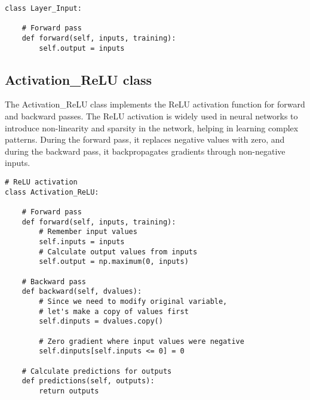 \documentclass{article}
\begin{document}
\begin{lstlisting}
class Layer_Input:

    # Forward pass
    def forward(self, inputs, training):
        self.output = inputs
\end{lstlisting}
\pagebreak

\subsection{Activation\_ReLU class}

The Activation\_ReLU class implements the ReLU activation function for forward and backward passes. The ReLU activation is widely used in neural networks to introduce non-linearity and sparsity in the network, helping in learning complex patterns. During the forward pass, it replaces negative values with zero, and during the backward pass, it backpropagates gradients through non-negative inputs.
\begin{lstlisting}
# ReLU activation
class Activation_ReLU:

    # Forward pass
    def forward(self, inputs, training):
        # Remember input values
        self.inputs = inputs
        # Calculate output values from inputs
        self.output = np.maximum(0, inputs)

    # Backward pass
    def backward(self, dvalues):
        # Since we need to modify original variable,
        # let's make a copy of values first
        self.dinputs = dvalues.copy()

        # Zero gradient where input values were negative
        self.dinputs[self.inputs <= 0] = 0

    # Calculate predictions for outputs
    def predictions(self, outputs):
        return outputs
\end{lstlisting}
\end{document}
